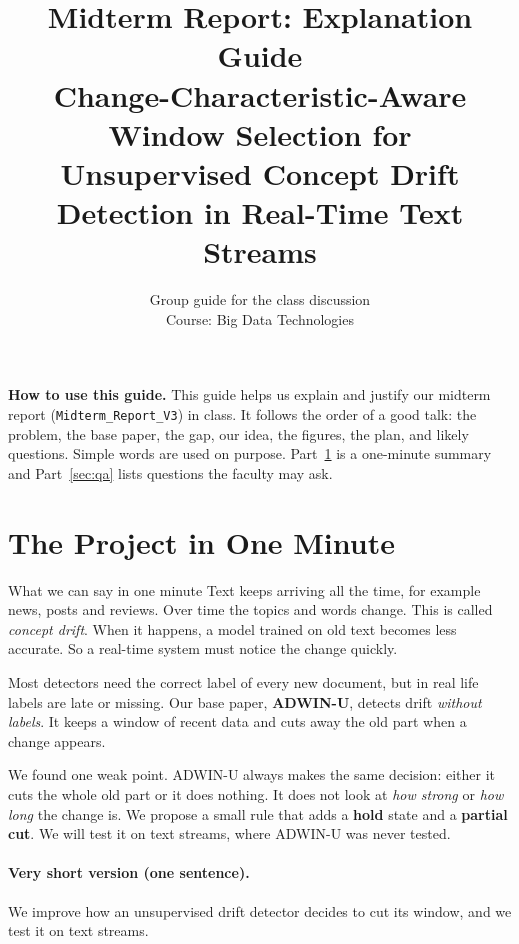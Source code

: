 \documentclass[11pt,a4paper]{article}
\title{\textbf{Midterm Report: Explanation Guide}\\[4pt]
\large Change-Characteristic-Aware Window Selection for Unsupervised Concept Drift Detection in Real-Time Text Streams}
\author{Group guide for the class discussion\\Course: Big Data Technologies}
\date{}
\begin{document}
\maketitle

\begin{keybox}
\textbf{How to use this guide.} This guide helps us explain and justify our midterm report (\texttt{Midterm\_Report\_V3}) in class. It follows the order of a good talk: the problem, the base paper, the gap, our idea, the figures, the plan, and likely questions. Simple words are used on purpose. Part~\ref{sec:oneminute} is a one-minute summary and Part~\ref{sec:qa} lists questions the faculty may ask.
\end{keybox}

\tableofcontents
\newpage

\section{The Project in One Minute}
\label{sec:oneminute}

\begin{saybox}{What we can say in one minute}
Text keeps arriving all the time, for example news, posts and reviews. Over time the topics and words change. This is called \emph{concept drift}. When it happens, a model trained on old text becomes less accurate. So a real-time system must notice the change quickly.

Most detectors need the correct label of every new document, but in real life labels are late or missing. Our base paper, \textbf{ADWIN-U}, detects drift \emph{without labels}. It keeps a window of recent data and cuts away the old part when a change appears.

We found one weak point. ADWIN-U always makes the same decision: either it cuts the whole old part or it does nothing. It does not look at \emph{how strong} or \emph{how long} the change is. We propose a small rule that adds a \textbf{hold} state and a \textbf{partial cut}. We will test it on text streams, where ADWIN-U was never tested.
\end{saybox}

\paragraph{Very short version (one sentence).}
We improve how an unsupervised drift detector decides to cut its window, and we test it on text streams.
\end{document}

